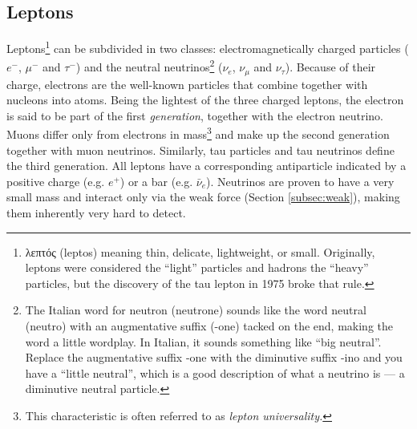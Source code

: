 \subsection{Leptons}
Leptons\footnote{\gr λεπτός \en (leptos) meaning thin, delicate, lightweight, or small. Originally, leptons were considered the ``light'' particles and hadrons the ``heavy'' particles, but the discovery of the tau lepton in 1975 broke that rule.} can be subdivided in two classes: electromagnetically charged particles ($e^-$, $\mu^-$ and $\tau^-$) and the neutral neutrinos\footnote{The Italian word for neutron (neutrone) sounds like the word neutral (neutro) with an augmentative suffix (-one) tacked on the end, making the word a little wordplay. In Italian, it sounds something like ``big neutral''. Replace the augmentative suffix -one with the diminutive suffix -ino and you have a ``little neutral'', which is a good description of what a neutrino is — a diminutive neutral particle.} ($\nu_{e}$, $\nu_{\mu}$ and $\nu_{\tau}$). Because of their charge, electrons are the well-known particles that combine together with nucleons into atoms. Being the lightest of the three charged leptons, the electron is said to be part of the first \textit{generation}, together with the electron neutrino. Muons differ only from electrons in mass\footnote{This characteristic is often referred to as \textit{lepton universality.}} and make up the second generation together with muon neutrinos. Similarly, tau particles and tau neutrinos define the third generation. All leptons have a corresponding antiparticle indicated by a positive charge (e.g. $e^+$) or a bar (e.g. $\bar{\nu}_e$). Neutrinos are proven to have a very small mass \cite{RevModPhys.88.030502} and interact only via the weak force (Section \ref{subsec:weak}), making them inherently very hard to detect.

